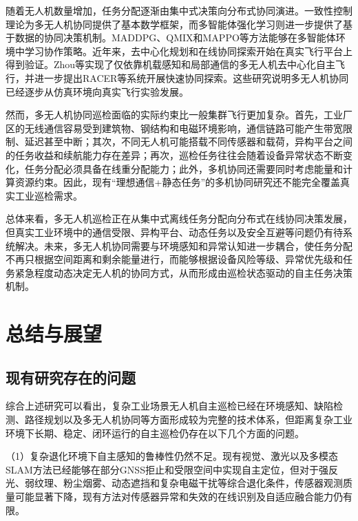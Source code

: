 随着无人机数量增加，任务分配逐渐由集中式决策向分布式协同演进。一致性控制理论为多无人机协同提供了基本数学框架\cite{olfati2004consensus,ren2005consensus,olfati2006flocking}，而多智能体强化学习则进一步提供了基于数据的协同决策机制。MADDPG、QMIX和MAPPO等方法能够在多智能体环境中学习协作策略\cite{lowe2017multi,rashid2018qmix,yu2022surprising}。近年来，去中心化规划和在线协同探索开始在真实飞行平台上得到验证。Zhou等实现了仅依靠机载感知和局部通信的多无人机去中心化自主飞行，并进一步提出RACER等系统开展快速协同探索\cite{zhou2021decentralized,zhou2022swarm,zhou2023racer}。这些研究说明多无人机协同已经逐步从仿真环境向真实飞行实验发展。

然而，多无人机协同巡检面临的实际约束比一般集群飞行更加复杂。首先，工业厂区的无线通信容易受到建筑物、钢结构和电磁环境影响，通信链路可能产生带宽限制、延迟甚至中断\cite{zeng2016wireless,mozaffari2019tutorial}；其次，不同无人机可能搭载不同传感器和载荷，异构平台之间的任务收益和续航能力存在差异；再次，巡检任务往往会随着设备异常状态不断变化，任务分配必须具备在线重分配能力；此外，多机协同还需要同时考虑能量和计算资源约束\cite{zhang2019energy,zhou2018computation}。因此，现有“理想通信+静态任务”的多机协同研究还不能完全覆盖真实工业巡检需求。

总体来看，多无人机巡检正在从集中式离线任务分配向分布式在线协同决策发展，但真实工业环境中的通信受限、异构平台、动态任务以及安全互避等问题仍有待系统解决。未来，多无人机协同需要与环境感知和异常认知进一步耦合，使任务分配不再只根据空间距离和剩余能量进行，而能够根据设备风险等级、异常优先级和任务紧急程度动态决定无人机的协同方式，从而形成由巡检状态驱动的自主任务决策机制。

\section{总结与展望}

\subsection{现有研究存在的问题}

综合上述研究可以看出，复杂工业场景无人机自主巡检已经在环境感知、缺陷检测、路径规划以及多无人机协同等方面形成较为完整的技术体系，但距离复杂工业环境下长期、稳定、闭环运行的自主巡检仍存在以下几个方面的问题。

（1）复杂退化环境下自主感知的鲁棒性仍然不足。现有视觉、激光以及多模态SLAM方法已经能够在部分GNSS拒止和受限空间中实现自主定位，但对于强反光、弱纹理、粉尘烟雾、动态遮挡和复杂电磁干扰等综合退化条件，传感器观测质量可能显著下降，现有方法对传感器异常和失效的在线识别及自适应融合能力仍有限\cite{cadena2016past,lvyang2019sense,wujq2021review,petrlik2020robust}。

